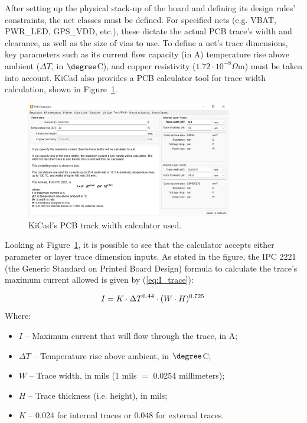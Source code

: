 After setting up the physical stack-up of the board and defining its design rules' constraints, the net classes must be defined. For specified nets (e.g. VBAT, PWR\_LED, GPS\_VDD, etc.), these dictate the actual PCB trace's width and clearance, as well as the size of vias to use. To define a net's trace dimensions, key parameters such as its current flow capacity (in A) temperature rise above ambient ($\Delta T$, in $\degree$C), and copper resistivity ($1.72 \cdot 10^{-8} \Omega$m) must be taken into account. KiCad also provides a PCB calculator tool for trace width calculation, shown in Figure~\ref{fig:PCB_calculator}.

\begin{figure}[h]
	\centering
	\includegraphics[width=0.8\textwidth]{Chapters/Figures/chapter5/PCB_calculator.png}
	\caption{KiCad's PCB track width calculator used.}
	\label{fig:PCB_calculator}
\end{figure}

Looking at Figure~\ref{fig:PCB_calculator}, it is possible to see that the calculator accepts either parameter or layer trace dimension inputs. As stated in the figure, the IPC 2221 (the Generic Standard on Printed Board Design) formula to calculate the trace's maximum current allowed is given by (\ref{eq:I_trace}):

\begin{equation}\label{eq:I_trace}
	I = K \cdot \Delta T^{0.44} \cdot (W \cdot H)^{0.725}\,\medskip
\end{equation}
\noindent Where:
\begin{itemize}
	\item $I$ -- Maximum current that will flow through the trace, in A;
	
	\item $\Delta T$ -- Temperature rise above ambient, in $\degree$C;
	
	\item $W$ -- Trace width, in mils (1 mils $=$ 0.0254 millimeters);
	
	\item $H$ -- Trace thickness (i.e. height), in mils;
	
	\item $K$ -- 0.024 for internal traces or 0.048 for external traces.
\end{itemize}

